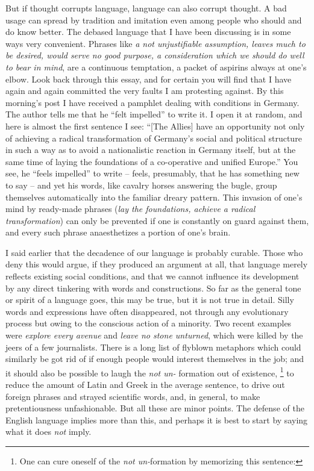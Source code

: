 \documentclass[article,twoside,a4paper]{memoir}
\begin{document}
But if thought corrupts language, language can also corrupt thought. A bad
usage can spread by tradition and imitation even among people who should and
do know better. The debased language that I have been discussing is in some
ways very convenient. Phrases like \emph{a not unjustifiable assumption, leaves
  much to be desired, would serve no good purpose, a consideration which we should
  do well to bear in mind}, are a continuous temptation, a packet of aspirins
always at one's elbow. Look back through this essay, and for certain you will
find that I have again and again committed the very faults I am protesting against.
By this morning's post I have received a pamphlet dealing with conditions in
Germany. The author tells me that he ``felt impelled'' to write it.
I open it at random, and here is almost the first sentence I see: ``[The
Allies] have an opportunity not only of achieving a radical transformation of
Germany's social and political structure in such a way as to avoid a nationalistic
reaction in Germany itself, but at the same time of laying the foundations of
a co-operative and unified Europe.'' You see, he ``feels impelled''
to write -- feels, presumably, that he has something new to say -- and yet his
words, like cavalry horses answering the bugle, group themselves automatically
into the familiar dreary pattern. This invasion of one's mind by ready-made
phrases (\emph{lay the foundations, achieve a radical transformation}) can only
be prevented if one is constantly on guard against them, and every such phrase
anaesthetizes a portion of one's brain.

I said earlier that the decadence of our language is probably curable. Those
who deny this would argue, if they produced an argument at all, that language
merely reflects existing social conditions, and that we cannot influence its
development by any direct tinkering with words and constructions. So far as
the general tone or spirit of a language goes, this may be true, but it is not
true in detail. Silly words and expressions have often disappeared, not through
any evolutionary process but owing to the conscious action of a minority. Two
recent examples were \emph{explore every avenue} and \emph{leave no stone unturned},
which were killed by the jeers of a few journalists. There is a long list of
flyblown metaphors which could similarly be got rid of if enough people would
interest themselves in the job; and it should also be possible to laugh the
\emph{not un-} formation out of existence,%
\footnote{
  One can cure oneself of the \emph{not un-}formation by memorizing this sentence:
}
to reduce the amount of Latin and
Greek in the average sentence, to drive out foreign phrases and strayed
scientific words, and, in general, to make pretentiousness
unfashionable.
But all these are minor points. The defense of the English language implies
more than this, and perhaps it is best to start by saying what it does \emph{not}
imply.
\end{document}
